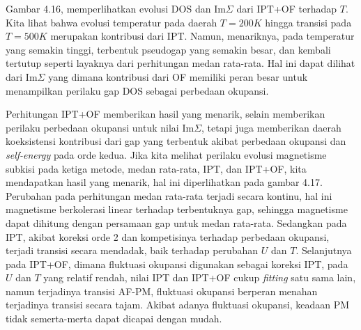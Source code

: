 Gambar 4.16, memperlihatkan evolusi DOS dan $\text{Im}\Sigma$ dari IPT+OF terhadap $T$. Kita lihat bahwa evolusi temperatur pada daerah $T = 200 K$ hingga transisi pada $T = 500K$ merupakan kontribusi dari IPT. Namun, menariknya, pada temperatur yang semakin tinggi, terbentuk pseudogap yang semakin besar, dan kembali tertutup seperti layaknya dari perhitungan medan rata-rata. Hal ini dapat dilihat dari $\text{Im}\Sigma$ yang dimana kontribusi dari OF memiliki peran besar untuk menampilkan perilaku gap DOS sebagai perbedaan okupansi.

Perhitungan IPT+OF memberikan hasil yang menarik, selain memberikan perilaku perbedaan okupansi untuk nilai $\text{Im}\Sigma$, tetapi juga memberikan daerah koeksistensi kontribusi dari gap yang terbentuk akibat perbedaan okupansi dan \textit{self-energy} pada orde kedua. Jika kita melihat perilaku evolusi magnetisme subkisi pada ketiga metode, medan rata-rata, IPT, dan IPT+OF, kita mendapatkan hasil yang menarik, hal ini diperlihatkan pada gambar 4.17. Perubahan pada perhitungan medan rata-rata terjadi secara kontinu, hal ini magnetisme berkolerasi linear terhadap terbentuknya gap, sehingga magnetisme dapat dihitung dengan persamaan gap untuk medan rata-rata\cite{staudt}. Sedangkan pada IPT, akibat koreksi orde 2 dan kompetisinya terhadap perbedaan okupansi, terjadi transisi secara mendadak, baik terhadap perubahan $U$ dan $T$. Selanjutnya pada IPT+OF, dimana fluktuasi okupansi digunakan sebagai koreksi IPT, pada $U$ dan $T$ yang relatif rendah, nilai IPT dan IPT+OF cukup \textit{fitting} satu sama lain, namun terjadinya transisi AF-PM, fluktuasi okupansi berperan menahan terjadinya transisi secara tajam. Akibat adanya fluktuasi okupansi, keadaan PM tidak semerta-merta dapat dicapai dengan mudah.

